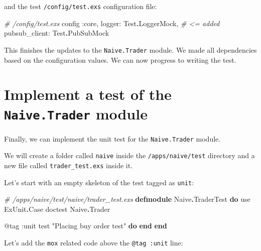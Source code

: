 \documentclass[
  oneside]{book}
\newenvironment{Shaded}{\begin{snugshade}}{\end{snugshade}}
\newcommand{\CommentTok}[1]{\textcolor[rgb]{0.56,0.35,0.01}{\textit{#1}}}
\newcommand{\ConstantTok}[1]{\textcolor[rgb]{0.56,0.35,0.01}{#1}}
\newcommand{\ImportTok}[1]{#1}
\newcommand{\KeywordTok}[1]{\textcolor[rgb]{0.13,0.29,0.53}{\textbf{#1}}}
\newcommand{\NormalTok}[1]{#1}
\newcommand{\OperatorTok}[1]{\textcolor[rgb]{0.81,0.36,0.00}{\textbf{#1}}}
\newcommand{\OtherTok}[1]{\textcolor[rgb]{0.56,0.35,0.01}{#1}}
\newcommand{\StringTok}[1]{\textcolor[rgb]{0.31,0.60,0.02}{#1}}
\newcommand{\VariableTok}[1]{\textcolor[rgb]{0.00,0.00,0.00}{#1}}
\begin{document}
and the test \texttt{/config/test.exs} configuration file:

\begin{Shaded}
\begin{Highlighting}[]
\CommentTok{\# /config/test.exs}
\NormalTok{config }\VariableTok{:core}\NormalTok{,                                   }
  \VariableTok{logger:} \ConstantTok{Test}\OperatorTok{.}\ConstantTok{LoggerMock}\NormalTok{,        }\CommentTok{\# \textless{}= added}
  \VariableTok{pubsub\_client:} \ConstantTok{Test}\OperatorTok{.}\ConstantTok{PubSubMock}
\end{Highlighting}
\end{Shaded}

This finishes the updates to the \texttt{Naive.Trader} module. We made all dependencies based on the configuration values. We can now progress to writing the test.

\section{\texorpdfstring{Implement a test of the \texttt{Naive.Trader} module}{Implement a test of the Naive.Trader module}}\label{implement-a-test-of-the-naive.trader-module}

Finally, we can implement the unit test for the \texttt{Naive.Trader} module.

We will create a folder called \texttt{naive} inside the \texttt{/apps/naive/test} directory and a new file called \texttt{trader\_test.exs} inside it.

Let's start with an empty skeleton of the test tagged as \texttt{unit}:

\begin{Shaded}
\begin{Highlighting}[]
\CommentTok{\# /apps/naive/test/naive/trader\_test.exs}
\KeywordTok{defmodule} \ConstantTok{Naive}\OperatorTok{.}\ConstantTok{TraderTest} \KeywordTok{do}
  \ImportTok{use} \ConstantTok{ExUnit}\OperatorTok{.}\ConstantTok{Case}
\NormalTok{  doctest }\ConstantTok{Naive}\OperatorTok{.}\ConstantTok{Trader}

  \OtherTok{@tag} \VariableTok{:unit}
\NormalTok{  test }\StringTok{"Placing buy order test"} \KeywordTok{do}
  \KeywordTok{end}
\KeywordTok{end}
\end{Highlighting}
\end{Shaded}

Let's add the \texttt{mox} related code above the \texttt{@tag\ :unit} line:
\end{document}
